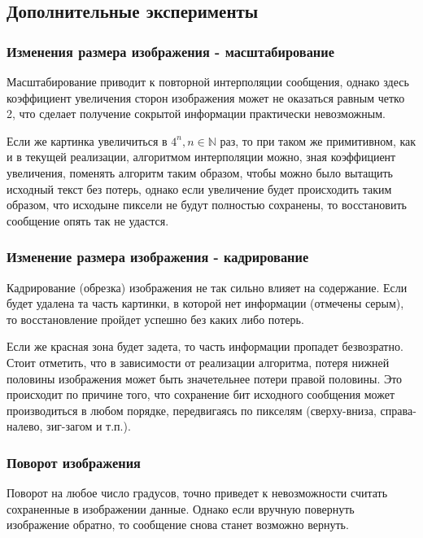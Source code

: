 \documentclass[a4paper]{article}
\begin{document}
  \subsection{Дополнительные эксперименты}

  \subsubsection{Изменения размера изображения - масштабирование}

  Масштабирование приводит к повторной интерполяции сообщения, однако здесь
  коэффициент увеличения сторон изображения может не оказаться равным четко 2,
  что сделает получение сокрытой информации практически невозможным.

  Если же картинка увеличиться в $4^n, n \in \mathbb{N}$ раз, то при таком же примитивном,
  как и в текущей реализации, алгоритмом интерполяции можно, зная коэффициент увеличения,
  поменять алгоритм таким образом, чтобы можно было вытащить исходный текст без потерь,
  однако если увеличение будет происходить таким образом, что исходыне пиксели не будут
  полностью сохранены, то восстановить сообщение опять так не удастся.

  \subsubsection{Изменение размера изображения - кадрирование}

  Кадрирование (обрезка) изображения не так сильно влияет на содержание.
  Если будет удалена та часть картинки, в которой нет информации (отмечены серым),
  то восстановление пройдет успешно без каких либо потерь.

  Если же красная зона будет задета, то часть информации пропадет безвозратно.
  Стоит отметить, что в зависимости от реализации алгоритма, потеря нижней
  половины изображения может быть значетельнее потери правой половины.
  Это происходит по причине того, что сохранение бит исходного сообщения
  может производиться в любом порядке, передвигаясь по пикселям (сверху-вниза,
  справа-налево, зиг-загом и т.п.).

  \subsubsection{Поворот изображения}

  Поворот на любое число градусов,
  точно приведет к невозможности считать сохраненные в изображении данные.
  Однако если вручную повернуть изображение обратно, то сообщение снова станет возможно вернуть.
\end{document}
